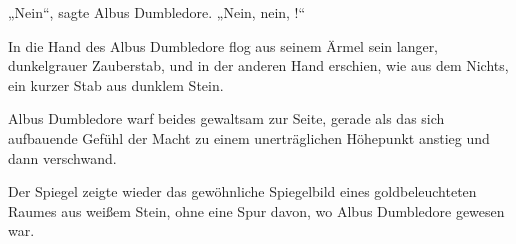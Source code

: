 „Nein“, sagte Albus Dumbledore. „Nein, nein, !“

In die Hand des Albus Dumbledore flog aus seinem Ärmel sein langer, dunkelgrauer Zauberstab, und in der anderen Hand erschien, wie aus dem Nichts, ein kurzer Stab aus dunklem Stein.

Albus Dumbledore warf beides gewaltsam zur Seite, gerade als das sich aufbauende Gefühl der Macht zu einem unerträglichen Höhepunkt anstieg und dann verschwand.

Der Spiegel zeigte wieder das gewöhnliche Spiegelbild eines goldbeleuchteten Raumes aus weißem Stein, ohne eine Spur davon, wo Albus Dumbledore gewesen war.

